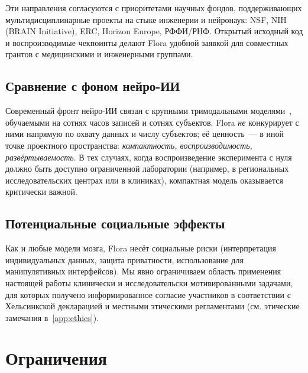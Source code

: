 \documentclass[11pt,a4paper]{article}
\begin{document}
Эти направления согласуются с приоритетами научных фондов,
поддерживающих мультидисциплинарные проекты на стыке инженерии
и нейронаук: NSF, NIH (BRAIN Initiative), ERC, Horizon Europe,
РФФИ/РНФ. Открытый исходный код и воспроизводимые чекпоинты
делают Flora удобной заявкой для совместных грантов с медицинскими
и инженерными группами.

\subsection{Сравнение с фоном нейро-ИИ}
\label{sec:disc-comparison}

Современный фронт нейро-ИИ связан с крупными
тримодальными моделями~\cite{dAscoli2026tribe,dAscoli2026tribev2},
обучаемыми на сотнях часов записей и сотнях субъектов. Flora
\emph{не} конкурирует с ними напрямую по охвату данных и числу
субъектов; её ценность~--- в иной точке проектного пространства:
\emph{компактность, воспроизводимость, развёртываемость}. В тех
случаях, когда воспроизведение эксперимента с нуля должно быть
доступно ограниченной лаборатории (например, в региональных
исследовательских центрах или в клиниках), компактная модель
оказывается критически важной.

\subsection{Потенциальные социальные эффекты}
\label{sec:disc-social}

Как и любые модели мозга, Flora несёт социальные риски (интерпретация
индивидуальных данных, защита приватности, использование для
манипулятивных интерфейсов). Мы явно ограничиваем область применения
настоящей работы клинически и исследовательски мотивированными
задачами, для которых получено информированное согласие участников
в соответствии с Хельсинкской декларацией и местными этическими
регламентами (см. этические замечания в~\cref{app:ethics}).

\section{Ограничения}
\label{sec:limitations}
\end{document}
